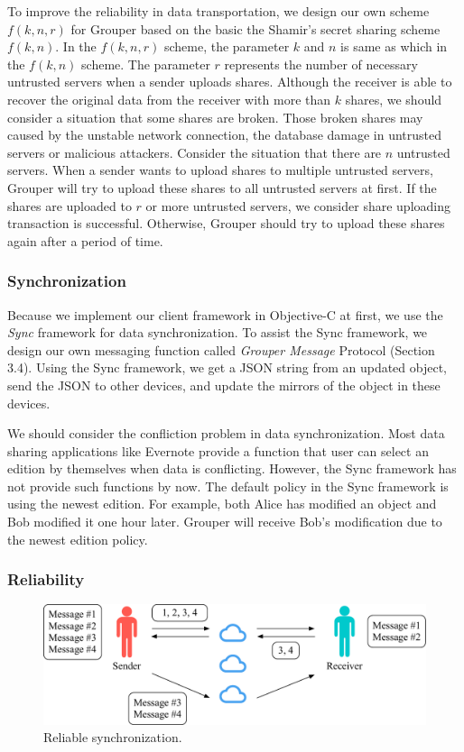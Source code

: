 \documentclass[twocolumn,10pt]{article}
\begin{document}
To improve the reliability in data transportation, we design our own scheme $f(k, n, r)$ for Grouper based on the basic the Shamir's secret sharing scheme $f(k, n)$.
In the $f(k, n, r)$ scheme, the parameter $k$ and $n$ is same as which in the  $f(k, n)$ scheme. 
The parameter $r$ represents the number of necessary untrusted servers when a sender uploads shares.
Although the receiver is able to recover the original data from the receiver with more than $k$ shares, we should consider a situation that some shares are broken.
Those broken shares may caused by the unstable network connection, the database damage in untrusted servers or malicious attackers.
Consider the situation that there are $n$ untrusted servers. 
When a sender wants to upload shares to multiple untrusted servers, Grouper will try to upload these shares to all untrusted servers at first.
If the shares are uploaded to $r$ or more untrusted servers, we consider share uploading transaction is successful.
Otherwise, Grouper should try to upload these shares again after a period of time.

\subsubsection{Synchronization}

Because we implement our client framework in Objective-C at first, we use the \emph{Sync} framework\cite{sync} for data synchronization.
To assist the Sync framework, we design our own messaging function called \emph{Grouper Message} Protocol (Section 3.4).
Using the Sync framework, we get a JSON string from an updated object, send the JSON to other devices, and update the mirrors of the object in these devices. 

We should consider the confliction problem in data synchronization. Most data sharing applications like Evernote provide a function that user can select an edition by themselves when data is conflicting. However, the Sync framework has not provide such functions by now. The default policy in the Sync framework is using the newest edition. For example, both Alice has modified an object and Bob modified it one hour later. Grouper will receive Bob's modification due to the newest edition policy. 

\subsubsection{Reliability}

\begin{figure}[t]
	\centering
	\includegraphics[scale=0.38]{reliable_sync}
	\caption{Reliable synchronization.}
\end{figure}
\end{document}
